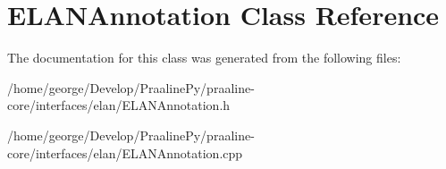 \hypertarget{class_e_l_a_n_annotation}{}\section{E\+L\+A\+N\+Annotation Class Reference}
\label{class_e_l_a_n_annotation}


The documentation for this class was generated from the following files\+:\begin{DoxyCompactItemize}
\item 
/home/george/\+Develop/\+Praaline\+Py/praaline-\/core/interfaces/elan/E\+L\+A\+N\+Annotation.\+h\item 
/home/george/\+Develop/\+Praaline\+Py/praaline-\/core/interfaces/elan/E\+L\+A\+N\+Annotation.\+cpp\end{DoxyCompactItemize}
